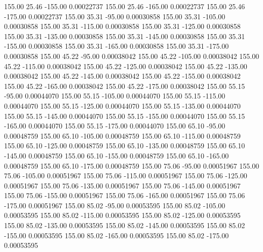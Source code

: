     155.00     25.46   -155.00     0.00022737
    155.00     25.46   -165.00     0.00022737
    155.00     25.46   -175.00     0.00022737
    155.00     35.31    -95.00     0.00030858
    155.00     35.31   -105.00     0.00030858
    155.00     35.31   -115.00     0.00030858
    155.00     35.31   -125.00     0.00030858
    155.00     35.31   -135.00     0.00030858
    155.00     35.31   -145.00     0.00030858
    155.00     35.31   -155.00     0.00030858
    155.00     35.31   -165.00     0.00030858
    155.00     35.31   -175.00     0.00030858
    155.00     45.22    -95.00     0.00038042
    155.00     45.22   -105.00     0.00038042
    155.00     45.22   -115.00     0.00038042
    155.00     45.22   -125.00     0.00038042
    155.00     45.22   -135.00     0.00038042
    155.00     45.22   -145.00     0.00038042
    155.00     45.22   -155.00     0.00038042
    155.00     45.22   -165.00     0.00038042
    155.00     45.22   -175.00     0.00038042
    155.00     55.15    -95.00     0.00044070
    155.00     55.15   -105.00     0.00044070
    155.00     55.15   -115.00     0.00044070
    155.00     55.15   -125.00     0.00044070
    155.00     55.15   -135.00     0.00044070
    155.00     55.15   -145.00     0.00044070
    155.00     55.15   -155.00     0.00044070
    155.00     55.15   -165.00     0.00044070
    155.00     55.15   -175.00     0.00044070
    155.00     65.10    -95.00     0.00048759
    155.00     65.10   -105.00     0.00048759
    155.00     65.10   -115.00     0.00048759
    155.00     65.10   -125.00     0.00048759
    155.00     65.10   -135.00     0.00048759
    155.00     65.10   -145.00     0.00048759
    155.00     65.10   -155.00     0.00048759
    155.00     65.10   -165.00     0.00048759
    155.00     65.10   -175.00     0.00048759
    155.00     75.06    -95.00     0.00051967
    155.00     75.06   -105.00     0.00051967
    155.00     75.06   -115.00     0.00051967
    155.00     75.06   -125.00     0.00051967
    155.00     75.06   -135.00     0.00051967
    155.00     75.06   -145.00     0.00051967
    155.00     75.06   -155.00     0.00051967
    155.00     75.06   -165.00     0.00051967
    155.00     75.06   -175.00     0.00051967
    155.00     85.02    -95.00     0.00053595
    155.00     85.02   -105.00     0.00053595
    155.00     85.02   -115.00     0.00053595
    155.00     85.02   -125.00     0.00053595
    155.00     85.02   -135.00     0.00053595
    155.00     85.02   -145.00     0.00053595
    155.00     85.02   -155.00     0.00053595
    155.00     85.02   -165.00     0.00053595
    155.00     85.02   -175.00     0.00053595
